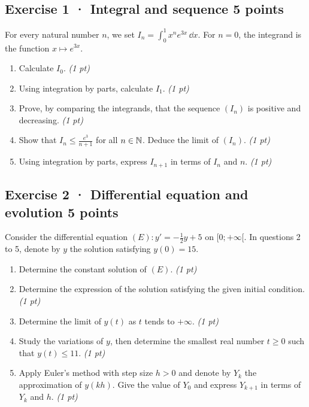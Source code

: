 \subsection*{Exercise 1 · Integral and sequence \hfill 5 points}For every natural number $n$, we set $I_n=\displaystyle\int_0^1x^ne^{3x}\,\dd x$. For $n=0$, the integrand is the function $x\mapsto e^{3x}$.

\begin{enumerate}

\item Calculate $I_0$. \hfill\textit{(1 pt)}

\item Using integration by parts, calculate $I_1$. \hfill\textit{(1 pt)}

\item Prove, by comparing the integrands, that the sequence $(I_n)$ is positive and decreasing. \hfill\textit{(1 pt)}

\item Show that $I_n\le\frac{e^{3}}{n+1}$ for all $n\in\mathbb N$. Deduce the limit of $(I_n)$. \hfill\textit{(1 pt)}

\item Using integration by parts, express $I_{n+1}$ in terms of $I_n$ and $n$. \hfill\textit{(1 pt)}

\end{enumerate}

\subsection*{Exercise 2 · Differential equation and evolution \hfill 5 points}Consider the differential equation $(E):y'=-\frac1{2}y+5$ on $[0;+\infty[$. In questions 2 to 5, denote by $y$ the solution satisfying $y(0)=15$.

\begin{enumerate}

\item Determine the constant solution of $(E)$. \hfill\textit{(1 pt)}

\item Determine the expression of the solution satisfying the given initial condition. \hfill\textit{(1 pt)}

\item Determine the limit of $y(t)$ as $t$ tends to $+\infty$. \hfill\textit{(1 pt)}

\item Study the variations of $y$, then determine the smallest real number $t\ge0$ such that $y(t)\le11$. \hfill\textit{(1 pt)}

\item Apply Euler's method with step size $h>0$ and denote by $Y_k$ the approximation of $y(kh)$. Give the value of $Y_0$ and express $Y_{k+1}$ in terms of $Y_k$ and $h$. \hfill\textit{(1 pt)}

\end{enumerate}

